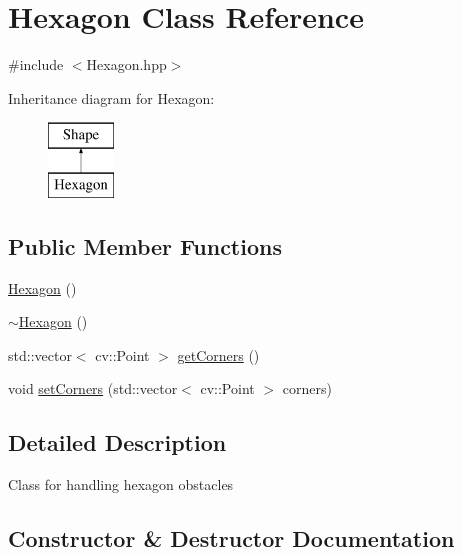 \hypertarget{class_hexagon}{}\section{Hexagon Class Reference}
\label{class_hexagon}


{\ttfamily \#include $<$Hexagon.\+hpp$>$}

Inheritance diagram for Hexagon\+:\begin{figure}[H]
\begin{center}
\leavevmode
\includegraphics[height=2.000000cm]{class_hexagon}
\end{center}
\end{figure}
\subsection*{Public Member Functions}
\begin{DoxyCompactItemize}
\item 
\mbox{\hyperlink{class_hexagon_ab503950412a7f11dab9c697c45b614a2}{Hexagon}} ()
\item 
\mbox{\hyperlink{class_hexagon_aaaa69a37657fe47cad3c17d7c3569318}{$\sim$\+Hexagon}} ()
\item 
std\+::vector$<$ cv\+::\+Point $>$ \mbox{\hyperlink{class_hexagon_aa12df068505254931530cbe74ac85ad0}{get\+Corners}} ()
\item 
void \mbox{\hyperlink{class_hexagon_a1b5cdb94637901f346373429660af3b1}{set\+Corners}} (std\+::vector$<$ cv\+::\+Point $>$ corners)
\end{DoxyCompactItemize}


\subsection{Detailed Description}
Class for handling hexagon obstacles 

\subsection{Constructor \& Destructor Documentation}
\mbox{\label{class_hexagon_ab503950412a7f11dab9c697c45b614a2}} 
